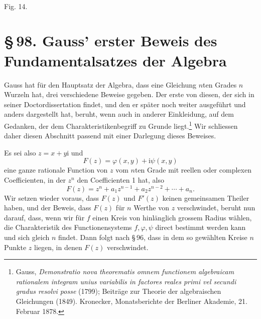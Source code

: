 \documentclass[11pt]{article}
\providecommand{\ii}{\mathrm{i}}
\providecommand{\sect}[2]{\section*{\S\,#1. #2}}
\begin{document}
\begin{center}
\\[-0.2em]
{\small Fig. 14.}
\end{center}


\sect{98}{Gauss' erster Beweis des Fundamentalsatzes der Algebra}

Gauss hat für den Hauptsatz der Algebra, dass eine Gleichung $n$ten Grades $n$ Wurzeln hat, drei verschiedene Beweise gegeben. Der erste von diesen, der sich in seiner Doctordissertation findet, und den er später noch weiter ausgeführt und anders dargestellt hat, beruht, wenn auch in anderer Einkleidung, auf dem Gedanken, der dem Charakteristikenbegriff zu Grunde liegt.\footnote{Gauss, \emph{Demonstratio nova theorematis omnem functionem algebraicam rationalem integram unius variabilis in factores reales primi vel secundi gradus resolvi posse} (1799); Beiträge zur Theorie der algebraischen Gleichungen (1849). Kronecker, Monatsberichte der Berliner Akademie, 21. Februar 1878.} Wir schliessen daher diesen Abschnitt passend mit einer Darlegung dieses Beweises.

Es sei also $z=x+y\ii$ und
\begin{equation}
        F(z)=\varphi(x,y)+\ii\psi(x,y)
\tag{1}
\end{equation}
eine ganze rationale Function von $z$ vom $n$ten Grade mit reellen oder complexen Coefficienten, in der $z^n$ den Coefficienten 1 hat, also
\begin{equation}
        F(z)=z^n+a_1z^{n-1}+a_2z^{n-2}+\cdots+a_n.
\tag{2}
\end{equation}
Wir setzen wieder voraus, dass $F(z)$ und $F'(z)$ keinen gemeinsamen Theiler haben, und der Beweis, dass $F(z)$ für $n$ Werthe von $z$ verschwindet, beruht nun darauf, dass, wenn wir für $f$ einen Kreis von hinlänglich grossem Radius wählen, die Charakteristik des Functionensystems $f,\varphi,\psi$ direct bestimmt werden kann und sich gleich $n$ findet. Dann folgt nach \S\,96, dass in dem so gewählten Kreise $n$ Punkte $z$ liegen, in denen $F(z)$ verschwindet.
\end{document}
